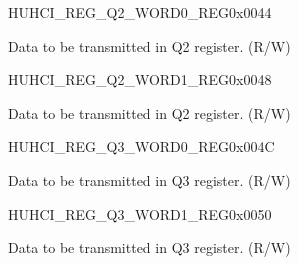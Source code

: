 \begin{register}{H}{UHCI\_REG\_Q2\_WORD0\_REG}{0x0044}\label{regdesc:UHCIREGQ2WORD0REG}
%
\regnewline%
\begin{regdesc}\begin{reglist}
\label{fielddesc:UHCISENDQ2WORD0}\item [UHCI\_SEND\_Q2\_WORD0] Data to be transmitted in Q2 register. (R/W)
\end{reglist}\end{regdesc}
\end{register}


\begin{register}{H}{UHCI\_REG\_Q2\_WORD1\_REG}{0x0048}\label{regdesc:UHCIREGQ2WORD1REG}
%
\regnewline%
\begin{regdesc}\begin{reglist}
\label{fielddesc:UHCISENDQ2WORD1}\item [UHCI\_SEND\_Q2\_WORD1] Data to be transmitted in Q2 register. (R/W)
\end{reglist}\end{regdesc}
\end{register}


\begin{register}{H}{UHCI\_REG\_Q3\_WORD0\_REG}{0x004C}\label{regdesc:UHCIREGQ3WORD0REG}
%
\regnewline%
\begin{regdesc}\begin{reglist}
\label{fielddesc:UHCISENDQ3WORD0}\item [UHCI\_SEND\_Q3\_WORD0] Data to be transmitted in Q3 register. (R/W)
\end{reglist}\end{regdesc}
\end{register}


\begin{register}{H}{UHCI\_REG\_Q3\_WORD1\_REG}{0x0050}\label{regdesc:UHCIREGQ3WORD1REG}
%
\regnewline%
\begin{regdesc}\begin{reglist}
\label{fielddesc:UHCISENDQ3WORD1}\item [UHCI\_SEND\_Q3\_WORD1] Data to be transmitted in Q3 register. (R/W)
\end{reglist}\end{regdesc}
\end{register}


